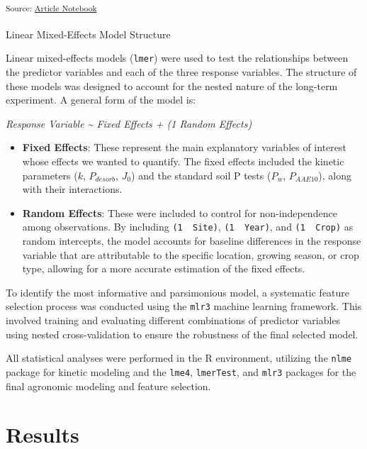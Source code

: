 \documentclass[
  a4paper,
]{article}
\makeatletter
\let\oldparagraph\paragraph
\renewcommand{\paragraph}{
    \@ifstar
      \xxxParagraphStar
      \xxxParagraphNoStar
  }
\newcommand{\xxxParagraphStar}[1]{\oldparagraph*{#1}\mbox{}}
\newcommand{\xxxParagraphNoStar}[1]{\oldparagraph{#1}\mbox{}}
\providecommand{\tightlist}{%
  \setlength{\itemsep}{0pt}\setlength{\parskip}{0pt}}\usepackage{longtable,booktabs,array}
\makeatother
\begin{document}
\textsubscript{Source:
\href{https://Andrapodon.github.io/Master-Thesis-P-kinetics/index.qmd.html}{Article
Notebook}}

\paragraph{Linear Mixed-Effects Model
Structure}\label{linear-mixed-effects-model-structure}

Linear mixed-effects models (\texttt{lmer}) were used to test the
relationships between the predictor variables and each of the three
response variables. The structure of these models was designed to
account for the nested nature of the long-term experiment. A general
form of the model is:

\emph{Response Variable \textasciitilde{} Fixed Effects + (1 \textbar{}
Random Effects)}

\begin{itemize}
\tightlist
\item
  \textbf{Fixed Effects}: These represent the main explanatory variables
  of interest whose effects we wanted to quantify. The fixed effects
  included the kinetic parameters (\(k\), \(P_{desorb}\), \(J_0\)) and
  the standard soil P tests (\(P_w\), \(P_{AAE10}\)), along with their
  interactions.
\item
  \textbf{Random Effects}: These were included to control for
  non-independence among observations. By including
  \texttt{(1\ \textbar{}\ Site)}, \texttt{(1\ \textbar{}\ Year)}, and
  \texttt{(1\ \textbar{}\ Crop)} as random intercepts, the model
  accounts for baseline differences in the response variable that are
  attributable to the specific location, growing season, or crop type,
  allowing for a more accurate estimation of the fixed effects.
\end{itemize}

To identify the most informative and parsimonious model, a systematic
feature selection process was conducted using the \texttt{mlr3} machine
learning framework. This involved training and evaluating different
combinations of predictor variables using nested cross-validation to
ensure the robustness of the final selected model.

All statistical analyses were performed in the R environment, utilizing
the \texttt{nlme} package for kinetic modeling and the \texttt{lme4},
\texttt{lmerTest}, and \texttt{mlr3} packages for the final agronomic
modeling and feature selection.

\section{Results}\label{results}
\end{document}
